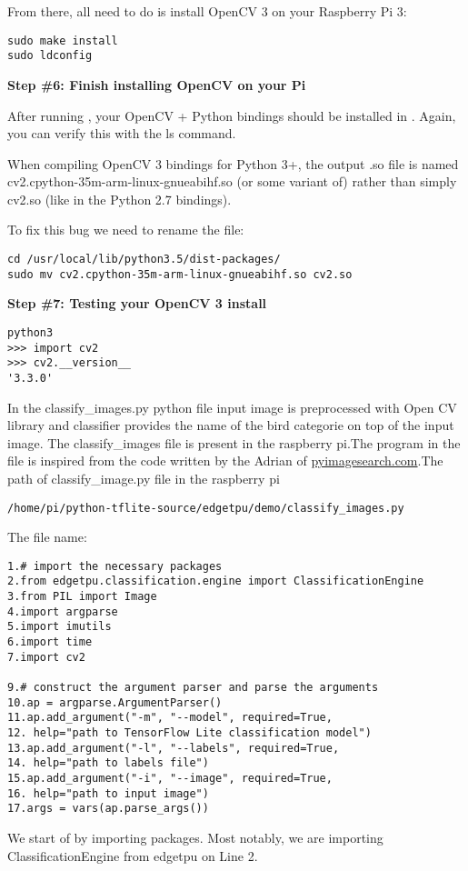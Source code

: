 From there, all need to do is install OpenCV 3 on your Raspberry Pi 3:

\begin{verbatim}
sudo make install
sudo ldconfig
\end{verbatim}

\textbf{Step \#6: Finish installing OpenCV on your Pi}

After running , your OpenCV + Python bindings should be installed in . Again, you can verify this with the ls command.

When compiling OpenCV 3 bindings for Python 3+, the output .so file is named cv2.cpython-35m-arm-linux-gnueabihf.so (or some variant of) rather than simply cv2.so (like in the Python 2.7 bindings).

To fix this bug we need to rename the file:

\begin{verbatim}
cd /usr/local/lib/python3.5/dist-packages/
sudo mv cv2.cpython-35m-arm-linux-gnueabihf.so cv2.so
\end{verbatim}

\textbf{Step \#7: Testing your OpenCV 3 install}

\begin{verbatim}
python3
>>> import cv2
>>> cv2.__version__
'3.3.0'
\end{verbatim}

In the classify\_images.py python file input image is preprocessed with Open CV library and classifier provides the name of the bird categorie  on  top of the input image.
The classify\_images file is present in the raspberry pi.The program in the file is inspired from the code written by the Adrian of \href{https://www.pyimagesearch.com/2019/05/13/object-detection-and-image-classification-with-google-coral-usb-accelerator/}{pyimagesearch.com}.The path of classify\_image.py file in the raspberry pi \begin{verbatim}
/home/pi/python-tflite-source/edgetpu/demo/classify_images.py
\end{verbatim}

\medskip

The file name: 

\medskip


\begin{verbatim}
1.# import the necessary packages
2.from edgetpu.classification.engine import ClassificationEngine
3.from PIL import Image
4.import argparse
5.import imutils
6.import time
7.import cv2

9.# construct the argument parser and parse the arguments
10.ap = argparse.ArgumentParser()
11.ap.add_argument("-m", "--model", required=True,
12.	help="path to TensorFlow Lite classification model")
13.ap.add_argument("-l", "--labels", required=True,
14.	help="path to labels file")
15.ap.add_argument("-i", "--image", required=True,
16.	help="path to input image")
17.args = vars(ap.parse_args())

\end{verbatim}
We start of by importing packages. Most notably, we are importing ClassificationEngine  from edgetpu  on Line 2.\newline

